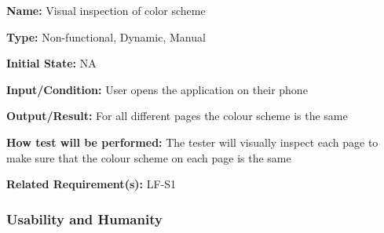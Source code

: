\documentclass[12pt, titlepage]{article}
\begin{document}
\begin{enumerate}
\textbf{Name:} Visual inspection of color scheme

\textbf{Type:} Non-functional, Dynamic, Manual
					
\textbf{Initial State:} NA
					
\textbf{Input/Condition:} User opens the application on their phone
					
\textbf{Output/Result:} For all different pages the colour scheme is the same

\textbf{How test will be performed:} The tester will visually inspect each page to make sure that the colour scheme on each page is the same

\textbf{Related Requirement(s):} LF-S1
\end{enumerate}

\subsubsection{Usability and Humanity}
\end{document}
